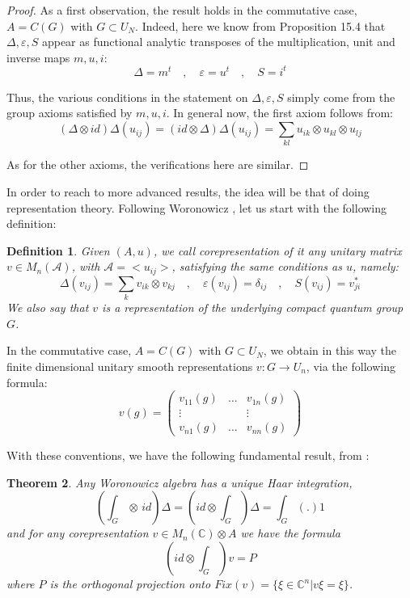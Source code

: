 \documentclass[12pt]{amsbook}
\newtheorem{theorem}{Theorem}[chapter]
\newtheorem{definition}[theorem]{Definition}
\begin{document}
\begin{proof}
As a first observation, the result holds in the commutative case, $A=C(G)$ with $G\subset U_N$. Indeed, here we know from Proposition 15.4 that $\Delta,\varepsilon,S$ appear as functional analytic transposes of the multiplication, unit and inverse maps $m,u,i$:
$$\Delta=m^t\quad,\quad 
\varepsilon=u^t\quad,\quad 
S=i^t$$

Thus, the various conditions in the statement on $\Delta,\varepsilon,S$ simply come from the group axioms satisfied by $m,u,i$. In general now, the first axiom follows from:
$$(\Delta\otimes id)\Delta(u_{ij})=(id\otimes \Delta)\Delta(u_{ij})=\sum_{kl}u_{ik}\otimes u_{kl}\otimes u_{lj}$$

As for the other axioms, the verifications here are similar.
\end{proof}

In order to reach to more advanced results, the idea will be that of doing representation theory. Following Woronowicz \cite{wo1}, let us start with the following definition:

\begin{definition}
Given $(A,u)$, we call corepresentation of it any unitary matrix $v\in M_n(\mathcal A)$, with $\mathcal A=<u_{ij}>$, satisfying the same conditions as $u$, namely:
$$\Delta(v_{ij})=\sum_kv_{ik}\otimes v_{kj}\quad,\quad
\varepsilon(v_{ij})=\delta_{ij}\quad,\quad
S(v_{ij})=v_{ji}^*$$
We also say that $v$ is a representation of the underlying compact quantum group $G$.
\end{definition}

In the commutative case, $A=C(G)$ with $G\subset U_N$, we obtain in this way the finite dimensional unitary smooth representations $v:G\to U_n$, via the following formula:
$$v(g)=\begin{pmatrix}
v_{11}(g)&\ldots&v_{1n}(g)\\
\vdots&&\vdots\\
v_{n1}(g)&\ldots&v_{nn}(g)
\end{pmatrix}$$

With these conventions, we have the following fundamental result, from \cite{wo1}:

\begin{theorem}
Any Woronowicz algebra has a unique Haar integration, 
$$\left(\int_G\otimes\, id\right)\Delta=\left(id\otimes\int_G\right)\Delta=\int_G(.)1$$
and for any corepresentation $v\in M_n(\mathbb C)\otimes A$ we have the formula
$$\left(id\otimes\int_G\right)v=P$$
where $P$ is the orthogonal projection onto $Fix(v)=\{\xi\in\mathbb C^n|v\xi=\xi\}$.
\end{theorem}
\end{document}
